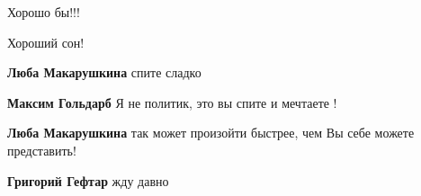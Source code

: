 \begin{itemize}
 
Хорошо бы!!!

 
Хороший сон!

\begin{itemize}
 
\textbf{Люба Макарушкина} спите сладко

 
\textbf{Максим Гольдарб} Я не политик, это вы спите и мечтаете !

 
\textbf{Люба Макарушкина} так может произойти быстрее, чем Вы себе можете представить!

 
\textbf{Григорий Гефтар} жду давно

 

\end{itemize}
\end{itemize}
